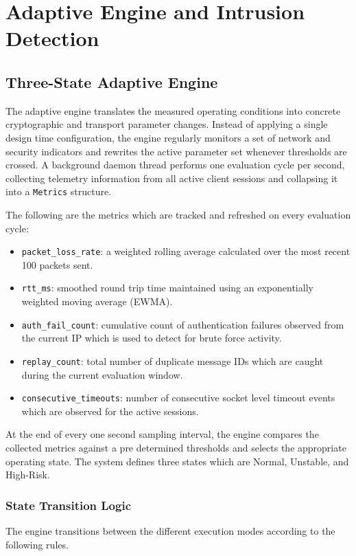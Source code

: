 \documentclass[conference]{IEEEtran}
\begin{document}
\section{Adaptive Engine and Intrusion Detection}
\label{sec:adaptive_engine}

\subsection{Three-State Adaptive Engine}

The adaptive engine translates the measured operating conditions into concrete cryptographic and transport parameter changes. Instead of applying a single design time configuration, the engine regularly monitors a set of network and security indicators and rewrites the active parameter set whenever thresholds are crossed. A background daemon thread performs one evaluation cycle per second, collecting telemetry information from all active client sessions and collapsing it into a \texttt{Metrics} structure.

The following are the metrics which are tracked and refreshed on every evaluation cycle:
\begin{itemize}
    \item \texttt{packet\_loss\_rate}: a weighted rolling average calculated over the most recent 100 packets sent.
    \item \texttt{rtt\_ms}: smoothed round trip time maintained using an exponentially weighted moving average (EWMA).
    \item \texttt{auth\_fail\_count}: cumulative count of authentication failures observed from the current IP which is used to detect for brute force activity.
    \item \texttt{replay\_count}: total number of duplicate message IDs which are caught during the current evaluation window.
    \item \texttt{consecutive\_timeouts}: number of consecutive socket level timeout events which are observed for the active sessions.
\end{itemize}

At the end of every one second sampling interval, the engine compares the collected metrics against a pre determined thresholds and selects the appropriate operating state. The system defines three states which are Normal, Unstable, and High-Risk.

\subsubsection{State Transition Logic}
The engine transitions between the different execution modes according to the following rules.
\end{document}

